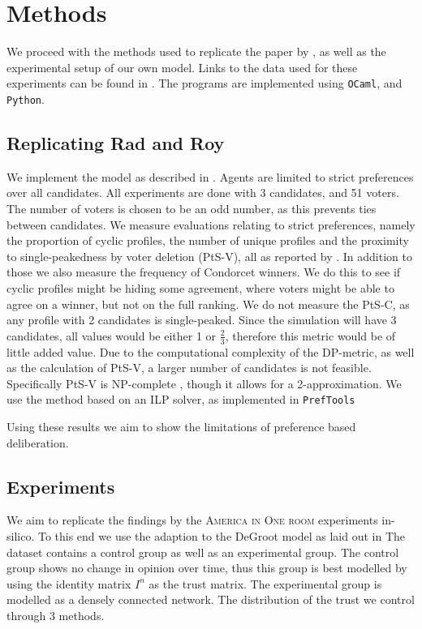 \chapter{Methods}
\label{Methods}



We proceed with the methods used to replicate the paper by
\citet{radDeliberationSinglePeakednessCoherent2021}, as well as the
experimental setup of our own model. Links to the data used for these
experiments can be found in . The programs
are implemented using \texttt{OCaml}, and \texttt{Python}.


\section{Replicating Rad and Roy} We implement the model as described in
. Agents are limited to strict preferences over all
candidates. All experiments are done with 3 candidates, and 51 voters. The
number of voters is chosen to be an odd number, as this prevents ties between
candidates. We measure evaluations relating to strict preferences, namely the
proportion of cyclic profiles, the number of unique profiles and the proximity
to single-peakedness by voter deletion (PtS-V), all as reported by
\citet{radDeliberationSinglePeakednessCoherent2021}. In addition to those we
also measure the frequency of Condorcet winners. We do this to see if cyclic
profiles might be hiding some agreement, where voters might be able to agree on
a winner, but not on the full ranking. We do not measure the PtS-C, as any
profile with 2 candidates is single-peaked. Since the simulation will have 3
candidates, all values would be either 1 or $\frac{2}{3}$, therefore this metric
would be of little added value. Due to the computational complexity of the
DP-metric, as well as the calculation of PtS-V, a larger number of candidates is not
feasible. Specifically PtS-V is NP-complete
\cite{erdelyiComputationalAspectsNearly2013}, though it allows for a
2-approximation. We use the method based on an ILP solver, as implemented in
\texttt{PrefTools} \cite{PrefLibPreflibtools2025}

Using these results we aim to show the limitations of preference based deliberation.

\section{Experiments}
We aim to replicate the findings by the \textsc{America in One room}
experiments \cite{fishkinCanDeliberationHave2024} in-silico. To this end we
use the adaption to the DeGroot model as laid out in 
The dataset contains a control group as well as an experimental group. The control group shows no change in opinion over time,
thus this group is best modelled by using the identity matrix $I^n$ as the
trust matrix. The experimental group is modelled as a densely connected
network.  The distribution of the trust we control through 3 methods.

